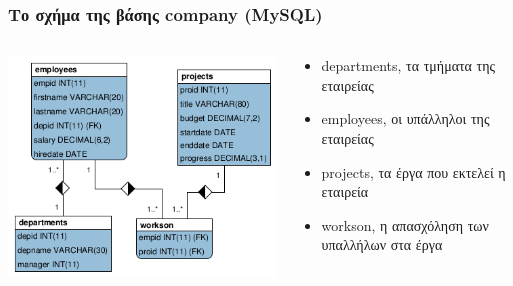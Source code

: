 \begin{frame}
\frametitle{Το σχήμα της βάσης {\en company (MySQL)}}
\begin{minipage}{\wE}
\begin{columns}
\begin{column}{0.55\linewidth}
\begin{center}
\includegraphics[scale=0.5]{../common/companyER.png}
\end{center}
\end{column}
\begin{column}{0.4\linewidth}
\begin{center}
\begin{itemize}
  \item {\ra departments}, τα τμήματα της εταιρείας
  \item {\ra employees}, οι υπάλληλοι της εταιρείας
  \item {\ra projects}, τα έργα που εκτελεί η εταιρεία
  \item {\ra workson}, η απασχόληση των υπαλλήλων στα έργα
\end{itemize}
\end{center}
\end{column}
\end{columns}
\end{minipage}
\end{frame}



